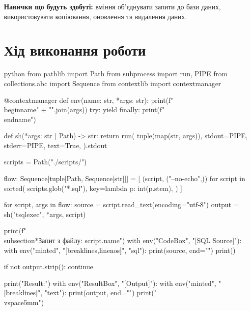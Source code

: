 \documentclass{article}
\begin{document}
    \textbf{Навички що будуть здобуті:} вміння об’єднувати запити до бази даних, використовувати копіювання, оновлення та видалення даних.
    
    \section*{Хід виконання роботи}
    \begin{sciffi}{python}
        from pathlib import Path
        from subprocess import run, PIPE
        from collections.abc import Sequence
        from contextlib import contextmanager
        
        @contextmanager
        def env(name: str, *args: str):
            print(f"\\begin{{{name}}}" + "".join(args))
            try:
                yield
            finally:
                print(f"\\end{{{name}}}")

        def sh(*args: str | Path) -> str:
            return run(
                tuple(map(str, args)),
                stdout=PIPE,
                stderr=PIPE,
                text=True,
            ).stdout

        scripts = Path("./scripts/")

        flow: Sequence[tuple[Path, Sequence[str]]] = [
            (script, ("--no-echo",))
            for script in sorted(
                scripts.glob("*.sql"),
                key=lambda p: int(p.stem),
            )
        ]

        for script, args in flow:
            source = script.read_text(encoding="utf-8")
            output = sh("tsqlexec", *args, script)

            print(f"\\subsection*{{Запит з файлу: {script.name}}}")
            with env("CodeBox", "[SQL Source]"):
                with env("minted", "[breaklines,linenos]", "{sql}"):
                    print(source, end="")
            print()

            if not output.strip():
                continue

            print("Result:")
            with env("ResultBox", "[Output]"):
                with env("minted", "[breaklines]", "{text}"):
                    print(output, end="")
            print("\\vspace{5mm}")
    \end{sciffi}

    \newpage
\end{document}
